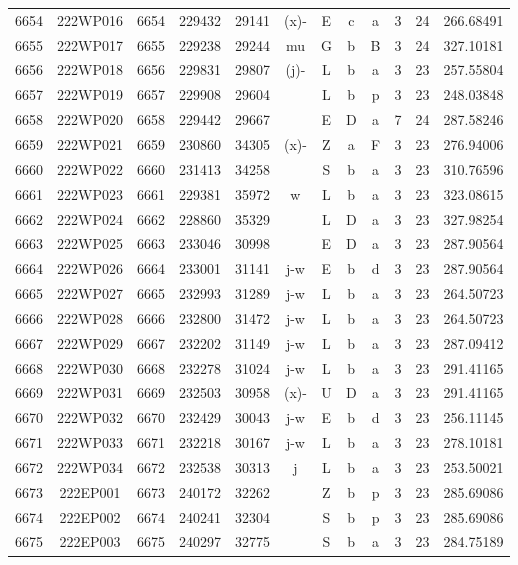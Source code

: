\begin{tabular}{|*{12}{c|}}
6654 & 222WP016 & 6654 & 229432 & 29141 & (x)- & E & c & a & 3 & 24 & 266.68491 \\ 
6655 & 222WP017 & 6655 & 229238 & 29244 & mu & G & b & B & 3 & 24 & 327.10181 \\ 
6656 & 222WP018 & 6656 & 229831 & 29807 & (j)- & L & b & a & 3 & 23 & 257.55804 \\ 
6657 & 222WP019 & 6657 & 229908 & 29604 &  & L & b & p & 3 & 23 & 248.03848 \\ 
6658 & 222WP020 & 6658 & 229442 & 29667 &  & E & D & a & 7 & 24 & 287.58246 \\ 
6659 & 222WP021 & 6659 & 230860 & 34305 & (x)- & Z & a & F & 3 & 23 & 276.94006 \\ 
6660 & 222WP022 & 6660 & 231413 & 34258 &  & S & b & a & 3 & 23 & 310.76596 \\ 
6661 & 222WP023 & 6661 & 229381 & 35972 & w & L & b & a & 3 & 23 & 323.08615 \\ 
6662 & 222WP024 & 6662 & 228860 & 35329 &  & L & D & a & 3 & 23 & 327.98254 \\ 
6663 & 222WP025 & 6663 & 233046 & 30998 &  & E & D & a & 3 & 23 & 287.90564 \\ 
6664 & 222WP026 & 6664 & 233001 & 31141 & j-w & E & b & d & 3 & 23 & 287.90564 \\ 
6665 & 222WP027 & 6665 & 232993 & 31289 & j-w & L & b & a & 3 & 23 & 264.50723 \\ 
6666 & 222WP028 & 6666 & 232800 & 31472 & j-w & L & b & a & 3 & 23 & 264.50723 \\ 
6667 & 222WP029 & 6667 & 232202 & 31149 & j-w & L & b & a & 3 & 23 & 287.09412 \\ 
6668 & 222WP030 & 6668 & 232278 & 31024 & j-w & L & b & a & 3 & 23 & 291.41165 \\ 
6669 & 222WP031 & 6669 & 232503 & 30958 & (x)- & U & D & a & 3 & 23 & 291.41165 \\ 
6670 & 222WP032 & 6670 & 232429 & 30043 & j-w & E & b & d & 3 & 23 & 256.11145 \\ 
6671 & 222WP033 & 6671 & 232218 & 30167 & j-w & L & b & a & 3 & 23 & 278.10181 \\ 
6672 & 222WP034 & 6672 & 232538 & 30313 & j & L & b & a & 3 & 23 & 253.50021 \\ 
6673 & 222EP001 & 6673 & 240172 & 32262 &  & Z & b & p & 3 & 23 & 285.69086 \\ 
6674 & 222EP002 & 6674 & 240241 & 32304 &  & S & b & p & 3 & 23 & 285.69086 \\ 
6675 & 222EP003 & 6675 & 240297 & 32775 &  & S & b & a & 3 & 23 & 284.75189 \\ 

\end{tabular}
